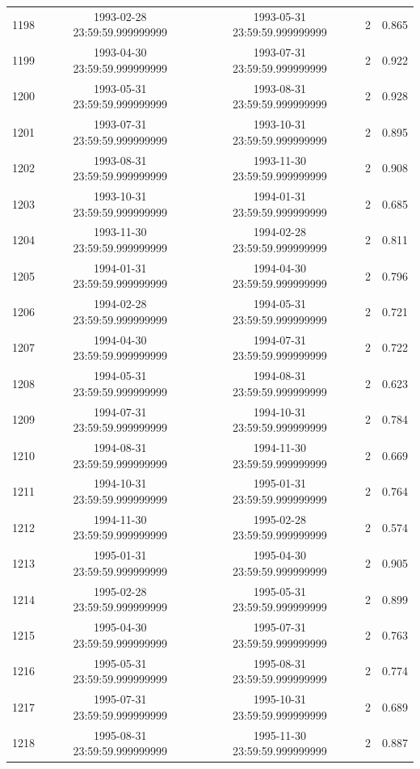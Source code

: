 \begin{table}
\begin{tabular}{lcccc}
1198 & 1993-02-28 23:59:59.999999999 & 1993-05-31 23:59:59.999999999 & 2 & 0.865 \\
1199 & 1993-04-30 23:59:59.999999999 & 1993-07-31 23:59:59.999999999 & 2 & 0.922 \\
1200 & 1993-05-31 23:59:59.999999999 & 1993-08-31 23:59:59.999999999 & 2 & 0.928 \\
1201 & 1993-07-31 23:59:59.999999999 & 1993-10-31 23:59:59.999999999 & 2 & 0.895 \\
1202 & 1993-08-31 23:59:59.999999999 & 1993-11-30 23:59:59.999999999 & 2 & 0.908 \\
1203 & 1993-10-31 23:59:59.999999999 & 1994-01-31 23:59:59.999999999 & 2 & 0.685 \\
1204 & 1993-11-30 23:59:59.999999999 & 1994-02-28 23:59:59.999999999 & 2 & 0.811 \\
1205 & 1994-01-31 23:59:59.999999999 & 1994-04-30 23:59:59.999999999 & 2 & 0.796 \\
1206 & 1994-02-28 23:59:59.999999999 & 1994-05-31 23:59:59.999999999 & 2 & 0.721 \\
1207 & 1994-04-30 23:59:59.999999999 & 1994-07-31 23:59:59.999999999 & 2 & 0.722 \\
1208 & 1994-05-31 23:59:59.999999999 & 1994-08-31 23:59:59.999999999 & 2 & 0.623 \\
1209 & 1994-07-31 23:59:59.999999999 & 1994-10-31 23:59:59.999999999 & 2 & 0.784 \\
1210 & 1994-08-31 23:59:59.999999999 & 1994-11-30 23:59:59.999999999 & 2 & 0.669 \\
1211 & 1994-10-31 23:59:59.999999999 & 1995-01-31 23:59:59.999999999 & 2 & 0.764 \\
1212 & 1994-11-30 23:59:59.999999999 & 1995-02-28 23:59:59.999999999 & 2 & 0.574 \\
1213 & 1995-01-31 23:59:59.999999999 & 1995-04-30 23:59:59.999999999 & 2 & 0.905 \\
1214 & 1995-02-28 23:59:59.999999999 & 1995-05-31 23:59:59.999999999 & 2 & 0.899 \\
1215 & 1995-04-30 23:59:59.999999999 & 1995-07-31 23:59:59.999999999 & 2 & 0.763 \\
1216 & 1995-05-31 23:59:59.999999999 & 1995-08-31 23:59:59.999999999 & 2 & 0.774 \\
1217 & 1995-07-31 23:59:59.999999999 & 1995-10-31 23:59:59.999999999 & 2 & 0.689 \\
1218 & 1995-08-31 23:59:59.999999999 & 1995-11-30 23:59:59.999999999 & 2 & 0.887 \\

\end{tabular}
\end{table}
